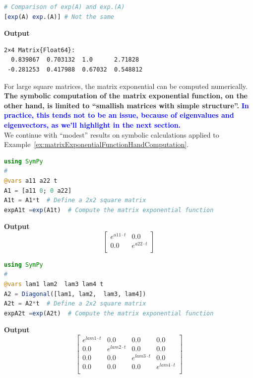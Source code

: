 \begin{lstlisting}[language=Julia,style=mystyle]
# Comparison of exp(A) and exp.(A)
[exp(A) exp.(A)] # Not the same
\end{lstlisting}
\textbf{Output} 
\begin{verbatim}
2×4 Matrix{Float64}:
  0.839867  0.703132  1.0      2.71828
 -0.281253  0.417988  0.67032  0.548812
\end{verbatim}

\bigskip
For large square matrices, the matrix exponential can be computed numerically. \textbf{The symbolic computation of the matrix exponential function, on the other hand, is limited to ``smallish matrices with simple structure''.} \textcolor{blue}{\bf In practice, this tends not to be an issue, because of eigenvalues and eigenvectors, as we'll highlight in the next section.} \\

We continue with ``modest'' results on symbolic calculations applied to Example~\ref{ex:matrixExponentialFunctionHandComputation}.

\begin{lstlisting}[language=Julia,style=mystyle]
using SymPy
# 
@vars a11 a22 t
A1 = [a11 0; 0 a22]
A1t = A1*t  # Define a 2x2 square matrix
expA1t =exp(A1t)  # Compute the matrix exponential function
\end{lstlisting}
\textbf{Output} 
$$
\left[
\begin{array}{cc}
e^{a11 \cdot t} & 0.0 \\
0.0 & e^{a22 \cdot t} \\
\end{array}
\right]
$$

\begin{lstlisting}[language=Julia,style=mystyle]
using SymPy
# 
@vars lam1 lam2  lam3 lam4 t
A2 = Diagonal([lam1, lam2,  lam3, lam4])
A2t = A2*t  # Define a 2x2 square matrix
expA2t =exp(A2t)  # Compute the matrix exponential function
\end{lstlisting}
\textbf{Output} 
$$\left[
\begin{array}{cccc}
e^{lam1 \cdot t} & 0.0 & 0.0 & 0.0 \\
0.0 & e^{lam2 \cdot t} & 0.0 & 0.0 \\
0.0 & 0.0 & e^{lam3 \cdot t} & 0.0 \\
0.0 & 0.0 & 0.0 & e^{lam4 \cdot t} \\
\end{array}
\right]$$

